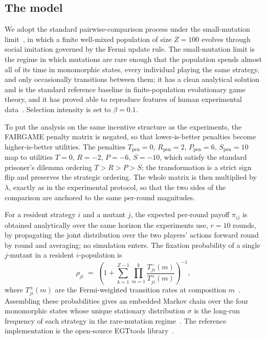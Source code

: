 \documentclass[11pt,a4paper]{article}
\newcommand{\lam}{\lambda}
\begin{document}
\subsection{The model}\label{appendix:egt_model}

We adopt the standard pairwise-comparison process under the small-mutation
limit~\cite{sigmund:2010bo,han_when_2021,nowak2004emergence,liu2020evolutionary},
in which a finite well-mixed population of size $Z = 100$ evolves through
social imitation governed by the Fermi update rule. The small-mutation limit is
the regime in which mutations are rare enough that the population spends almost
all of its time in monomorphic states, every individual playing the same
strategy, and only occasionally transitions between them; it has a clean
analytical solution and is the standard reference baseline in finite-population
evolutionary game theory, and it has proved able to reproduce features of human
experimental data~\cite{rand2013evolution,zisis2015generosity}. Selection
intensity is set to $\beta = 0.1$.

To put the analysis on the same incentive structure as the experiments, the
FAIRGAME penalty matrix is negated, so that lower-is-better penalties become
higher-is-better utilities. The penalties $T_{\text{pen}} = 0$,
$R_{\text{pen}} = 2$, $P_{\text{pen}} = 6$, $S_{\text{pen}} = 10$ map to
utilities $T = 0$, $R = -2$, $P = -6$, $S = -10$, which satisfy the standard
prisoner's dilemma ordering $T > R > P > S$; the transformation is a strict
sign flip and preserves the strategic ordering. The whole matrix is then
multiplied by $\lam$, exactly as in the experimental protocol, so that the two
sides of the comparison are anchored to the same per-round magnitudes.

For a resident strategy $i$ and a mutant $j$, the expected per-round payoff
$\pi_{ij}$ is obtained analytically over the same horizon the experiments use,
$r = 10$ rounds, by propagating the joint distribution over the two players'
actions forward round by round and averaging; no simulation enters. The
fixation probability of a single $j$-mutant in a resident $i$-population is
\begin{equation}
\rho_{ji} \;=\; \left(1 + \sum_{k=1}^{Z-1}\prod_{m=1}^{k}
   \frac{T^{-}_{ji}(m)}{T^{+}_{ji}(m)}\right)^{-1},
\label{eq:fixation}
\end{equation}
where $T^{\pm}_{ji}(m)$ are the Fermi-weighted transition rates at composition
$m$~\cite{szabo1998evolutionary}. Assembling these probabilities gives an
embedded Markov chain over the four monomorphic states whose unique stationary
distribution $\sigma$ is the long-run frequency of each strategy in the
rare-mutation regime~\cite{sigmund:2010bo}. The reference implementation is
the open-source EGTtools library~\cite{domingos2023egttools}.
\end{document}
